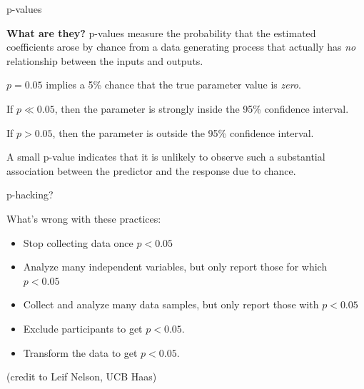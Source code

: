 \documentclass[aspectratio=169]{beamer}
\begin{document}
\begin{frame}{p-values}

\textbf{What are they?}  \pause p-values measure the probability that the estimated coefficients arose by chance from a data generating process that actually has \textit{no} relationship between the inputs and outputs.  

\vspace{5mm}

$p = 0.05$ implies a 5\% chance that the true parameter value is \textit{zero}.  

\vspace{5mm}

If $p\ll0.05$, then the parameter is strongly inside the 95\% confidence interval.

\vspace{5mm}

If $p>0.05$, then the parameter is outside the 95\% confidence interval.

\vspace{5mm}

A small p-value indicates that it is unlikely to observe such a substantial association between the predictor and the response due to chance.

\end{frame}

\begin{frame}{p-hacking?}

What's wrong with these practices:
\begin{itemize}
  \item Stop collecting data once $p<0.05$
  \item Analyze many independent variables, but only report those for which $p<0.05$
  \item Collect and analyze many data samples, but only report those with $p<0.05$
  \item Exclude participants to get  $p<0.05$.
  \item Transform the data to get  $p<0.05$.
\end{itemize}

(credit to Leif Nelson, UCB Haas)

\end{frame}
\end{document}
